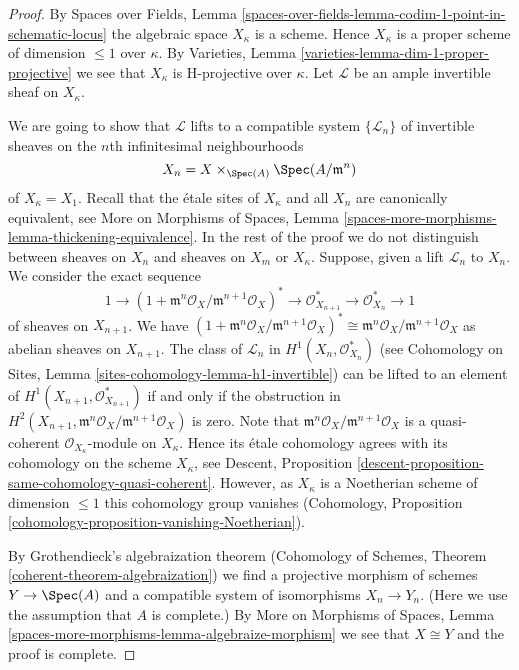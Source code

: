 \begin{proof}
By Spaces over Fields, Lemma
\ref{spaces-over-fields-lemma-codim-1-point-in-schematic-locus}
the algebraic space $X_\kappa$ is a scheme. Hence $X_\kappa$
is a proper scheme of dimension $\leq 1$ over $\kappa$.
By Varieties, Lemma \ref{varieties-lemma-dim-1-proper-projective}
we see that $X_\kappa$ is H-projective over $\kappa$.
Let $\mathcal{L}$ be an ample invertible sheaf on $X_\kappa$.

\medskip\noindent
We are going to show that $\mathcal{L}$ lifts to a compatible system
$\{\mathcal{L}_n\}$ of
invertible sheaves on the $n$th infinitesimal neighbourhoods
$$
X_n = X \times_{\Spec(A)} \Spec(A/\mathfrak m^n)
$$
of $X_\kappa = X_1$. Recall that the \'etale sites of $X_\kappa$
and all $X_n$ are canonically equivalent, see
More on Morphisms of Spaces, Lemma
\ref{spaces-more-morphisms-lemma-thickening-equivalence}.
In the rest of the proof we do not distinguish between sheaves on $X_n$
and sheaves on $X_m$ or $X_\kappa$.
Suppose, given a lift $\mathcal{L}_n$ to $X_n$. We consider
the exact sequence
$$
1 \to
(1 + \mathfrak m^n\mathcal{O}_X/\mathfrak m^{n + 1}\mathcal{O}_X)^* \to
\mathcal{O}_{X_{n + 1}}^* \to \mathcal{O}_{X_n}^* \to 1
$$
of sheaves on $X_{n + 1}$. We have
$(1 + \mathfrak m^n\mathcal{O}_X/\mathfrak m^{n + 1}\mathcal{O}_X)^*
\cong \mathfrak m^n\mathcal{O}_X/\mathfrak m^{n + 1}\mathcal{O}_X$
as abelian sheaves on $X_{n + 1}$. The class of $\mathcal{L}_n$ in
$H^1(X_n, \mathcal{O}_{X_n}^*)$ (see
Cohomology on Sites, Lemma \ref{sites-cohomology-lemma-h1-invertible})
can be lifted to an element of $H^1(X_{n + 1}, \mathcal{O}_{X_{n + 1}}^*)$
if and only if the obstruction in
$H^2(X_{n + 1}, \mathfrak m^n\mathcal{O}_X/\mathfrak m^{n + 1}\mathcal{O}_X)$
is zero. Note that
$\mathfrak m^n\mathcal{O}_X/\mathfrak m^{n + 1}\mathcal{O}_X$
is a quasi-coherent $\mathcal{O}_{X_\kappa}$-module on $X_\kappa$.
Hence its \'etale cohomology agrees with its cohomology on the
scheme $X_\kappa$, see
Descent, Proposition \ref{descent-proposition-same-cohomology-quasi-coherent}.
However, as $X_\kappa$ is a Noetherian scheme of dimension $\leq 1$
this cohomology group vanishes (Cohomology, Proposition
\ref{cohomology-proposition-vanishing-Noetherian}).

\medskip\noindent
By Grothendieck's algebraization theorem
(Cohomology of Schemes, Theorem \ref{coherent-theorem-algebraization})
we find a projective morphism of schemes $Y \to \Spec(A)$ and a compatible
system of isomorphisms $X_n \to Y_n$. (Here we use the assumption
that $A$ is complete.) By
More on Morphisms of Spaces, Lemma
\ref{spaces-more-morphisms-lemma-algebraize-morphism}
we see that $X \cong Y$ and the proof is complete.
\end{proof}

